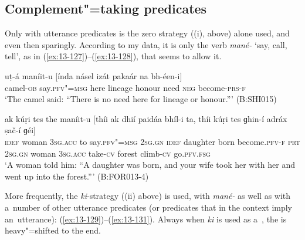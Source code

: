 \subsection{Complement"=taking  predicates}
\label{subsec:13-5-1}

 Only with utterance predicates is the zero strategy ((i), above) alone used, and even then sparingly. According to my data, it is only the verb \textit{mané-} `say, call, tell', as in (\ref{ex:13-127})--(\ref{ex:13-128}), that seems to allow it.

\begin{exe}
\ex
\label{ex:13-127}
\gll uṭ-á maníit-u [índa násel izát pakaár  na bh-éen-i]  \\
camel-\textsc{ob}  say.\textsc{pfv"=msg} here lineage honour need  \textsc{neg} become-\textsc{prs-f} \\
\glt `The camel said: ``There is no need here for lineage or honour.''' (B:SHI015)

\ex
\label{ex:13-128}
\gll ak kúṛi tes the maníit-u [thíi ak  dhií paidáa bhíl-i ta, thíi
  kúṛi tes  ɡhin-í adráx ṣač-í ɡéi] \\
\textsc{idef} woman \textsc{3sg.acc} to say.\textsc{pfv"=msg} \textsc{2sg.gn} \textsc{idef}  daughter born become.\textsc{pfv-f} \textsc{prt} \textsc{2sg.gn} woman \textsc{3sg.acc}  take-\textsc{cv} forest climb-\textsc{cv} go.\textsc{pfv.fsg}  \\
\glt `A woman told him: ``A daughter was born, and your wife took her with her and went up into the forest.''' (B:FOR013-4) 
\end{exe}

More frequently, the \textit{ki}-strategy ((ii) above) is used, with \textit{mané-} as well as with a~number of other utterance predicates (or predicates that in the context imply an~utterance): (\ref{ex:13-129})--(\ref{ex:13-131}). Always when \textit{ki} is used as a~, the  is heavy"=shifted to the end.


